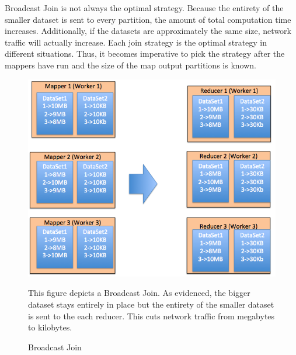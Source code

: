 Broadcast Join is not always the optimal strategy. Because the entirety of the smaller dataset is sent to every partition, the amount of total computation time increases. Additionally, if the datasets are approximately the same size, network traffic will actually increase. 
Each join strategy is the optimal strategy in different situations. Thus, it becomes imperative
to pick the strategy after the mappers have run and the size of the map output partitions is known.

 \begin{figure}[h]
\begin{center}
\includegraphics[scale=0.6]{./img/broadcast_join.png}
\caption{Broadcast Join}
\label{fig:broadcast_join}
\end{center}
This figure depicts a Broadcast Join. As evidenced, the bigger dataset stays entirely in place but the entirety 
of the smaller dataset is sent to the each reducer. This cuts network traffic from megabytes to kilobytes.
\end{figure}


